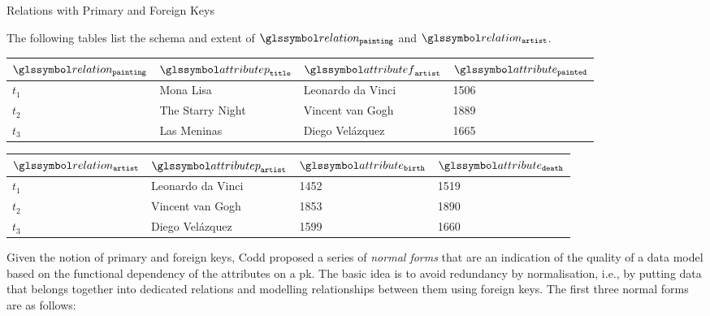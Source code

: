 \begin{example}[label=example:relational_table_pkfk]{Relations with Primary and Foreign Keys}{}
    
    The following tables list the schema and extent of $\relation_{\mathtt{painting}}$ and $\relation_{\mathtt{artist}}$.
    \begin{center}
        \begin{tabular}{ l || l | l | l |}
            $\relation_{\mathtt{painting}}$ & $\attributep_{\mathtt{title}}$  & $\attributef_{\mathtt{artist}}$  & $\attribute_{\mathtt{painted}}$ \\ 
            \hline
            \hline
            $t_1$ & Mona Lisa &  Leonardo da Vinci & 1506 \\
            \hline
            $t_2$ & The Starry Night & Vincent van Gogh & 1889 \\
            \hline
            $t_3$ & Las Meninas & Diego Velázquez & 1665 \\
            \hline
        \end{tabular}
    \end{center}

    \begin{center}
        \begin{tabular}{ l || l | l | l |}
            $\relation_{\mathtt{artist}}$ & $\attributep_{\mathtt{artist}}$ & $\attribute_{\mathtt{birth}}$ & $\attribute_{\mathtt{death}}$\\ 
            \hline
            \hline
            $t_1$ & Leonardo da Vinci & 1452 & 1519 \\
            \hline
            $t_2$ & Vincent van Gogh & 1853 & 1890 \\
            \hline
            $t_3$ & Diego Velázquez & 1599 & 1660 \\
            \hline
        \end{tabular}
    \end{center}
\end{example}

Given the notion of primary and foreign keys, Codd proposed a series of \emph{normal forms} that are an indication of the quality of a data model based on the functional dependency of the attributes on a \acrshort{pk}. The basic idea is to avoid redundancy by normalisation, i.e., by putting data that belongs together into dedicated relations and modelling relationships between them using foreign keys. The first three normal forms are as follows:

